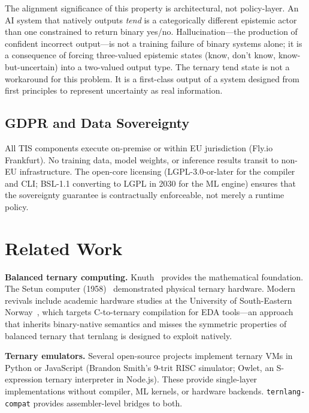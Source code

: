 \documentclass[11pt,a4paper]{article}
\begin{document}
The alignment significance of this property is architectural, not
policy-layer. An AI system that natively outputs \emph{tend} is a
categorically different epistemic actor than one constrained to return
binary yes/no. Hallucination---the production of confident incorrect
output---is not a training failure of binary systems alone; it is a
consequence of forcing three-valued epistemic states (know, don't know,
know-but-uncertain) into a two-valued output type. The ternary tend state
is not a workaround for this problem. It is a first-class output of a
system designed from first principles to represent uncertainty as real
information.

\subsection{GDPR and Data Sovereignty}

All TIS components execute on-premise or within EU jurisdiction (Fly.io
Frankfurt). No training data, model weights, or inference results transit
to non-EU infrastructure. The open-core licensing (LGPL-3.0-or-later for
the compiler and CLI; BSL-1.1 converting to LGPL in 2030 for the ML engine)
ensures that the sovereignty guarantee is contractually enforceable, not
merely a runtime policy.

\section{Related Work}
\label{sec:related}

\textbf{Balanced ternary computing.} Knuth~\cite{knuth1997art} provides the
mathematical foundation. The Setun computer (1958)~\cite{brousentsov2002setun}
demonstrated physical ternary hardware. Modern revivals include academic
hardware studies at the University of South-Eastern Norway~\cite{bos2020ternary},
which targets C-to-ternary compilation for EDA tools—an approach that inherits
binary-native semantics and misses the symmetric properties of balanced ternary
that ternlang is designed to exploit natively.

\textbf{Ternary emulators.} Several open-source projects implement ternary
VMs in Python or JavaScript (Brandon Smith's 9-trit RISC simulator; Owlet,
an S-expression ternary interpreter in Node.js). These provide single-layer
implementations without compiler, ML kernels, or hardware backends.
\texttt{ternlang-compat} provides assembler-level bridges to both.
\end{document}
